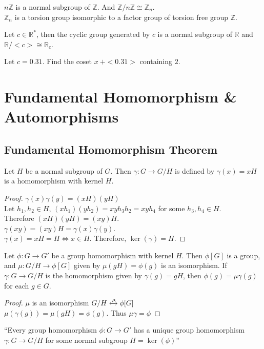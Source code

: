 \begin{remark}
	$n\mathbb{Z}$ is a normal subgroup of $\mathbb{Z}$. And $\mathbb{Z}/n\mathbb{Z} \cong \mathbb{Z}_n$.\\
	$\mathbb{Z}_n$ is a torsion group isomorphic to a factor group of torsion free group $\mathbb{Z}$.
\end{remark}

\begin{remark}
	Let $c \in \mathbb{R}^*$, then the cyclic group generated by $c$ is a normal subgroup of $\mathbb{R}$ and $\mathbb{R}/<c> \cong \mathbb{R}_c$.
\end{remark}

\begin{question}
	Let $c = 0.31$. Find the coset $x\ +<0.31>$ containing $2$.
\end{question}
\pagebreak

\section{Fundamental Homomorphism \& Automorphisms}
\subsection{Fundamental Homomorphism Theorem}
\begin{theorem}
	Let $H$ be a normal subgroup of $G$. Then $\gamma : G \to G/H$ is defined by $\gamma(x) = xH$  is a homomorphism with kernel $H$.
\end{theorem}
\begin{proof}
	$\gamma(x)\gamma(y) = (xH)(yH)$\\
	Let $h_1,h_2 \in H$, $(xh_1)(yh_2) = xyh_3h_2 = xyh_4$ for some $h_3,h_4 \in H$.\\
	Therefore $(xH)(yH) = (xy)H$.\\
	$\gamma(xy) = (xy)H = \gamma(x)\gamma(y)$.\\
	$\gamma(x) = xH = H \iff x \in H$. Therefore, $\ker(\gamma) = H$.
\end{proof}

\begin{theorem}
	Let $\phi : G \to G'$ be a group homomorphism with kernel $H$. Then $\phi[G]$ is a group, and $\mu : G/H \to \phi[G]$ given by $\mu(gH) = \phi(g)$ is an isomorphism. If $\gamma : G \to G/H$ is the homomorphism given by $\gamma(g) = gH$, then $\phi(g) = \mu\gamma(g)$ for each $g \in G$.
\end{theorem}
\begin{proof}
	$\mu$ is an isomorphism $G/H \xleftrightarrow{\mu}\phi[G]$\\
	$\mu(\gamma(g)) = \mu(gH) = \phi(g)$. Thus $\mu\gamma = \phi$
\end{proof}
``Every group homomorphism $\phi : G \to G'$ has a unique group homomorphism $\gamma : G \to G/H$ for some normal subgroup $H = \ker(\phi)$''

